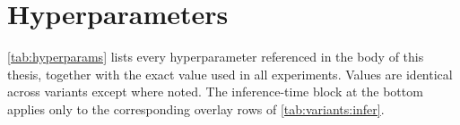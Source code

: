 \documentclass[a4paper,oneside,10pt,english]{scrbook}
\begin{document}







\cleardoubleoddpage





\appendix


\cleardoubleoddpage
\chapter{Hyperparameters}
\label{app:hyperparams}

\autoref{tab:hyperparams} lists every hyperparameter referenced in the body of this thesis, together with the exact value used in all experiments. Values are identical across variants except where noted. The inference-time block at the bottom applies only to the corresponding overlay rows of \autoref{tab:variants:infer}.
\end{document}
